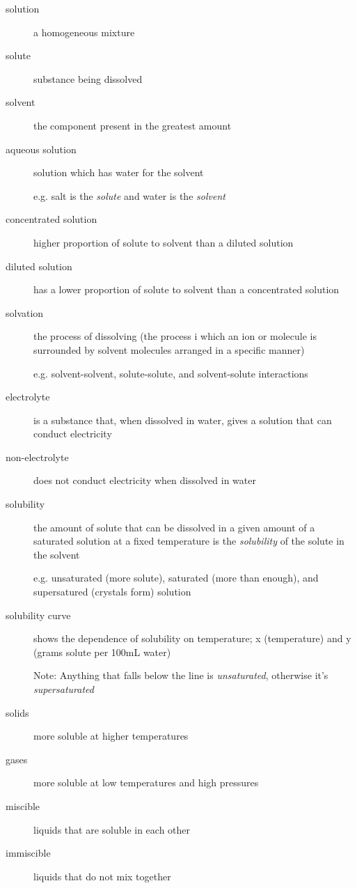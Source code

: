 \documentclass[11pt]{article}
\begin{document}
    \begin{description}
        \item[solution] a homogeneous mixture
        \item[solute] substance being dissolved
        \item[solvent] the component present in the greatest amount
        \item[aqueous solution] solution which has water for the solvent
        \item[] e.g. salt is the \emph{solute} and water is the \emph{solvent} 
        \item[concentrated solution] higher proportion of solute to solvent than a diluted solution
        \item[diluted solution] has a lower proportion of solute to solvent than a concentrated solution
        \item[solvation] the process of dissolving (the process i which an ion or molecule is surrounded by solvent molecules arranged in a specific manner)  
        \item[]e.g. solvent-solvent, solute-solute, and solvent-solute interactions
        \item[electrolyte] is a substance that, when dissolved in water, gives a solution that can conduct electricity
        \item[non-electrolyte] does not conduct electricity when dissolved in water
        \item[solubility] the amount of solute that can be dissolved in a given amount of a saturated solution at a fixed temperature is the \emph{solubility} of the solute in the solvent
        \item[]e.g. unsaturated (more solute), saturated (more than enough), and supersatured (crystals form) solution
        \item[solubility curve] shows the dependence of solubility on temperature; x (temperature) and y (grams solute per 100mL water)
        \item[]Note: Anything that falls below the line is \emph{unsaturated}, otherwise it's \emph{supersaturated}
        \item[solids] more soluble at higher temperatures
        \item[gases] more soluble at low temperatures and high pressures
        \item[miscible] liquids that are soluble in each other
        \item[immiscible] liquids that do not mix together
    \end{description}
\end{document}
